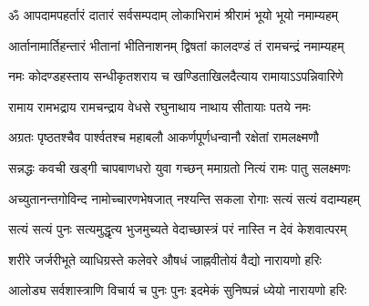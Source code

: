 
\twolineshloka
{ॐ आपदामपहर्तारं दातारं सर्वसम्पदाम्}
{लोकाभिरामं श्रीरामं भूयो भूयो नमाम्यहम्}

\twolineshloka
{आर्तानामार्तिहन्तारं भीतानां भीतिनाशनम्}
{द्विषतां कालदण्डं तं रामचन्द्रं नमाम्यहम्}

\twolineshloka
{नमः कोदण्डहस्ताय सन्धीकृतशराय च}
{खण्डिताखिलदैत्याय रामायाऽऽपन्निवारिणे}

\twolineshloka
{रामाय रामभद्राय रामचन्द्राय वेधसे}
{रघुनाथाय नाथाय सीतायाः पतये नमः}

\twolineshloka
{अग्रतः पृष्ठतश्चैव पार्श्वतश्च महाबलौ}
{आकर्णपूर्णधन्वानौ रक्षेतां रामलक्ष्मणौ}

\twolineshloka
{सन्नद्धः कवची खड्गी चापबाणधरो युवा}
{गच्छन् ममाग्रतो नित्यं रामः पातु सलक्ष्मणः}

\twolineshloka
{अच्युतानन्तगोविन्द नामोच्चारणभेषजात्}
{नश्यन्ति सकला रोगाः सत्यं सत्यं वदाम्यहम्}

\twolineshloka
{सत्यं सत्यं पुनः सत्यमुद्धृत्य भुजमुच्यते}
{वेदाच्छास्त्रं परं नास्ति न देवं केशवात्परम्}

\twolineshloka
{शरीरे जर्जरीभूते व्याधिग्रस्ते कलेवरे}
{औषधं जाह्नवीतोयं वैद्यो नारायणो हरिः}

\twolineshloka
{आलोड्य सर्वशास्त्राणि विचार्य च पुनः पुनः}
{इदमेकं सुनिष्पन्नं ध्येयो नारायणो हरिः}
